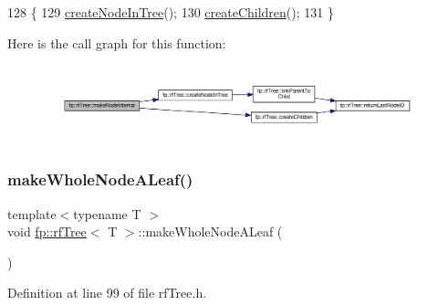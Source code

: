 \begin{DoxyCode}
128                                               \{
129                     \hyperlink{classfp_1_1rfTree_aaf9d8cdfbb1d10da53a375ea8204e393}{createNodeInTree}();
130                     \hyperlink{classfp_1_1rfTree_ad226037e7f93c0fa2a1a960e19a87bed}{createChildren}();
131                 \}
\end{DoxyCode}
Here is the call graph for this function\+:
\nopagebreak
\begin{figure}[H]
\begin{center}
\leavevmode
\includegraphics[width=350pt]{classfp_1_1rfTree_aaf7bbdde5f7313c3e84853bbf5fdf792_cgraph}
\end{center}
\end{figure}
\mbox{\label{classfp_1_1rfTree_a2b2a47186c0784415609f1c9b005e702}} 
\subsubsection{\texorpdfstring{make\+Whole\+Node\+A\+Leaf()}{makeWholeNodeALeaf()}\hspace{0.1cm}{\footnotesize\ttfamily [1/2]}}
{\footnotesize\ttfamily template$<$typename T $>$ \\
void \hyperlink{classfp_1_1rfTree}{fp\+::rf\+Tree}$<$ T $>$\+::make\+Whole\+Node\+A\+Leaf (\begin{DoxyParamCaption}{ }\end{DoxyParamCaption})\hspace{0.3cm}{\ttfamily [inline]}}



Definition at line 99 of file rf\+Tree.\+h.


